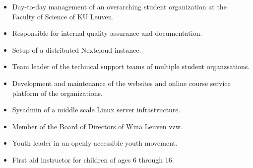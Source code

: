 \documentclass[10pt,a4paper,ragged2e]{altacv}
\begin{document}
\divider







\begin{itemize}
	\item Day-to-day management of an overarching student organization at the Faculty of Science of KU Leuven.
	\item Responsible for internal quality assurance and documentation.
	\item Setup of a distributed Nextcloud instance.
\end{itemize}

\divider


\begin{itemize}
	\item Team leader of the technical support teams of multiple student organzsations.
	\item Development and maintenance of the websites and online course service platform of the organizations.
	\item Sysadmin of a middle scale Linux server infrastructure.
	\item Member of the Board of Directors of Wina Leuven vzw.
\end{itemize}

\divider

\begin{itemize}
	\item Youth leader in an openly accessible youth movement.
	\item First aid instructor for children of ages 6 through 16.
\end{itemize}
\end{document}
